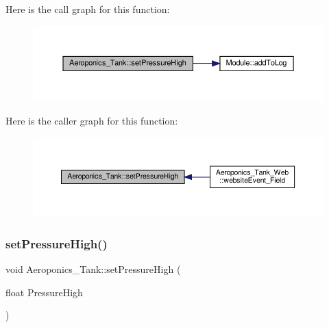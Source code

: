 Here is the call graph for this function\+:
\nopagebreak
\begin{figure}[H]
\begin{center}
\leavevmode
\includegraphics[width=350pt]{class_aeroponics___tank_a6081920c94e5909b98c1f9aa85bcf108_cgraph}
\end{center}
\end{figure}
Here is the caller graph for this function\+:
\nopagebreak
\begin{figure}[H]
\begin{center}
\leavevmode
\includegraphics[width=350pt]{class_aeroponics___tank_a6081920c94e5909b98c1f9aa85bcf108_icgraph}
\end{center}
\end{figure}
\mbox{\label{class_aeroponics___tank_a6081920c94e5909b98c1f9aa85bcf108}} 
\subsubsection{\texorpdfstring{set\+Pressure\+High()}{setPressureHigh()}\hspace{0.1cm}{\footnotesize\ttfamily [2/2]}}
{\footnotesize\ttfamily void Aeroponics\+\_\+\+Tank\+::set\+Pressure\+High (\begin{DoxyParamCaption}\item[{float}]{Pressure\+High }\end{DoxyParamCaption})\hspace{0.3cm}{\ttfamily [protected]}}

\mbox{\label{class_aeroponics___tank_a336c8e22072118cd60d912b28df660fb}} 
